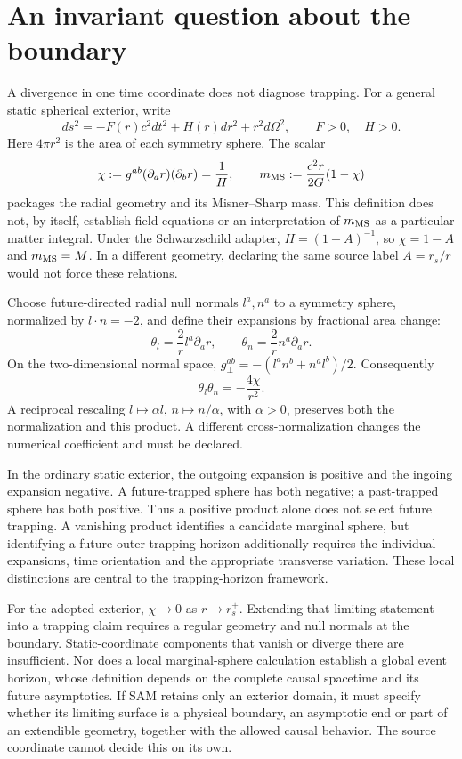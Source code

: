 \documentclass[10pt,twocolumn,letterpaper]{article}
\begin{document}
\section{An invariant question about the boundary}
\label{sec:invariant-closure}
A divergence in one time coordinate does not diagnose trapping. For a general static spherical exterior, write
\[
 ds^2=-F(r)c^2dt^2+H(r)dr^2+r^2d\Omega^2,
 \qquad F>0,\quad H>0.
\]
Here $4\pi r^2$ is the area of each symmetry sphere. The scalar
\begin{equation}
 \chi:=g^{ab}(\partial_a r)(\partial_b r)=\frac1H,
 \qquad
 m_{\rm MS}:=\frac{c^2r}{2G}(1-\chi)
 \label{eq:closure-invariant}
\end{equation}
packages the radial geometry and its Misner--Sharp mass.\cite{hayward1996} This definition does not, by itself, establish field equations or an interpretation of $m_{\rm MS}$ as a particular matter integral. Under the Schwarzschild adapter, $H=(1-A)^{-1}$, so $\chi=1-A$ and $m_{\rm MS}=M$. In a different geometry, declaring the same source label $A=r_s/r$ would not force these relations.

Choose future-directed radial null normals $l^a,n^a$ to a symmetry sphere, normalized by $l\cdot n=-2$, and define their expansions by fractional area change:
\[
 \theta_l=\frac{2}{r}l^a\partial_a r,
 \qquad
 \theta_n=\frac{2}{r}n^a\partial_a r.
\]
On the two-dimensional normal space,
$g^{ab}_{\perp}=-(l^an^b+n^al^b)/2$. Consequently
\begin{equation}
 \theta_l\theta_n=-\frac{4\chi}{r^2}.
 \label{eq:closure-expansions}
\end{equation}
A reciprocal rescaling $l\mapsto\alpha l$, $n\mapsto n/\alpha$, with $\alpha>0$, preserves both the normalization and this product. A different cross-normalization changes the numerical coefficient and must be declared.

In the ordinary static exterior, the outgoing expansion is positive and the ingoing expansion negative. A future-trapped sphere has both negative; a past-trapped sphere has both positive. Thus a positive product alone does not select future trapping. A vanishing product identifies a candidate marginal sphere, but identifying a future outer trapping horizon additionally requires the individual expansions, time orientation and the appropriate transverse variation. These local distinctions are central to the trapping-horizon framework.\cite{hayward1994}

For the adopted exterior, $\chi\to0$ as $r\to r_s^+$. Extending that limiting statement into a trapping claim requires a regular geometry and null normals at the boundary. Static-coordinate components that vanish or diverge there are insufficient. Nor does a local marginal-sphere calculation establish a global event horizon, whose definition depends on the complete causal spacetime and its future asymptotics. If SAM retains only an exterior domain, it must specify whether its limiting surface is a physical boundary, an asymptotic end or part of an extendible geometry, together with the allowed causal behavior. The source coordinate cannot decide this on its own.
\end{document}
